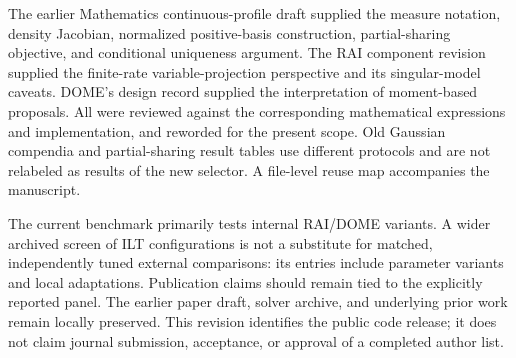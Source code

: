 The earlier Mathematics continuous-profile draft supplied the measure notation, density Jacobian, normalized positive-basis construction, partial-sharing objective, and conditional uniqueness argument. The RAI component revision supplied the finite-rate variable-projection perspective and its singular-model caveats. DOME's design record supplied the interpretation of moment-based proposals. All were reviewed against the corresponding mathematical expressions and implementation, and reworded for the present scope. Old Gaussian compendia and partial-sharing result tables use different protocols and are not relabeled as results of the new selector. A file-level reuse map accompanies the manuscript.

The current benchmark primarily tests internal RAI/DOME variants. A wider archived screen of ILT configurations is not a substitute for matched, independently tuned external comparisons: its entries include parameter variants and local adaptations. Publication claims should remain tied to the explicitly reported panel. The earlier paper draft, solver archive, and underlying prior work remain locally preserved. This revision identifies the public code release; it does not claim journal submission, acceptance, or approval of a completed author list.

